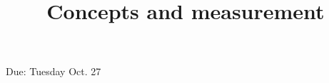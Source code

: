 \documentclass[a4, 12pt]{article}
\title{Concepts and measurement}
\author{}
\date{}
\begin{document}
\maketitle

Due: Tuesday Oct. 27
\end{document}
